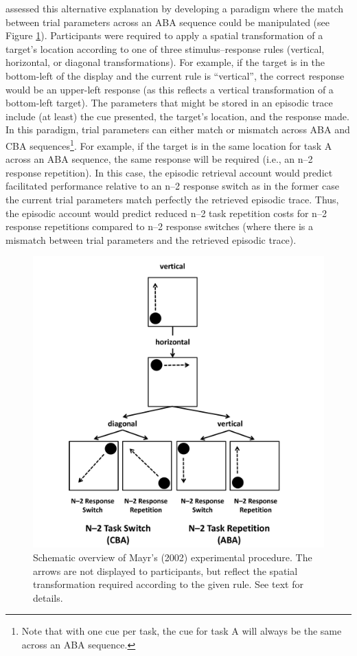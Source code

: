 \documentclass[a4paper, man, natbib]{apa6}
\begin{document}
\cite{Mayr2002} assessed this alternative explanation by developing a paradigm where the match between trial parameters across an ABA sequence could be manipulated (see Figure \ref{fig:mayrExperiment}). Participants were required to apply a spatial transformation of a target's location according to one of three stimulus--response rules (vertical, horizontal, or diagonal transformations). For example, if the target is in the bottom-left of the display and the current rule is ``vertical'', the correct response would be an upper-left response (as this reflects a vertical transformation of a bottom-left target). The parameters that might be stored in an episodic trace include (at least) the cue presented, the target's location, and the response made. In this paradigm, trial parameters can either match or mismatch across ABA and CBA sequences\footnote{Note that with one cue per task, the cue for task A will always be the same across an ABA sequence.}. For example, if the target is in the same location for task A across an ABA sequence, the same response will be required (i.e., an n--2 response repetition). In this case, the episodic retrieval account would predict facilitated performance relative to an n--2 response switch as in the former case the current trial parameters match perfectly the retrieved episodic trace. Thus, the episodic account would predict reduced n--2 task repetition costs for n--2 response repetitions compared to n--2 response switches (where there is a mismatch between trial parameters and the retrieved episodic trace).

\begin{figure}
\begin{center}
\includegraphics[width = \textwidth]{Images/mayrExperiment.pdf}
\caption{Schematic overview of Mayr's (2002) experimental procedure. The arrows are not displayed to participants, but reflect the spatial transformation required according to the given rule. See text for details.}
\label{fig:mayrExperiment}
\end{center}
\end{figure}
\end{document}
